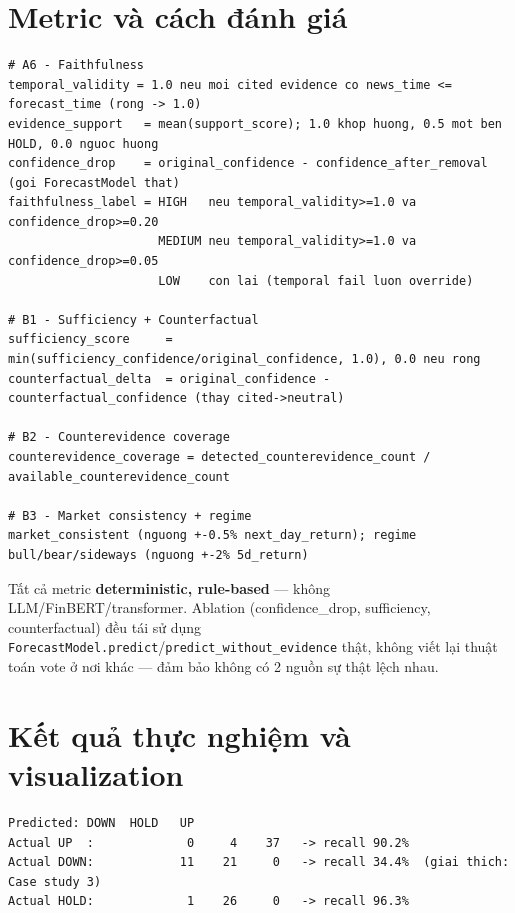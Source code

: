 \section{Metric và cách đánh giá}

\begin{singlespace}
\begin{lstlisting}[numbers=none]
# A6 - Faithfulness
temporal_validity = 1.0 neu moi cited evidence co news_time <= forecast_time (rong -> 1.0)
evidence_support   = mean(support_score); 1.0 khop huong, 0.5 mot ben HOLD, 0.0 nguoc huong
confidence_drop    = original_confidence - confidence_after_removal (goi ForecastModel that)
faithfulness_label = HIGH   neu temporal_validity>=1.0 va confidence_drop>=0.20
                     MEDIUM neu temporal_validity>=1.0 va confidence_drop>=0.05
                     LOW    con lai (temporal fail luon override)

# B1 - Sufficiency + Counterfactual
sufficiency_score     = min(sufficiency_confidence/original_confidence, 1.0), 0.0 neu rong
counterfactual_delta  = original_confidence - counterfactual_confidence (thay cited->neutral)

# B2 - Counterevidence coverage
counterevidence_coverage = detected_counterevidence_count / available_counterevidence_count

# B3 - Market consistency + regime
market_consistent (nguong +-0.5% next_day_return); regime bull/bear/sideways (nguong +-2% 5d_return)
\end{lstlisting}
\end{singlespace}

Tất cả metric \textbf{deterministic, rule-based} — không LLM/FinBERT/transformer. Ablation (confidence\_drop, sufficiency, counterfactual) đều tái sử dụng \texttt{ForecastModel.predict}/\texttt{predict\_without\_evidence} thật, không viết lại thuật toán vote ở nơi khác — đảm bảo không có 2 nguồn sự thật lệch nhau.

\section{Kết quả thực nghiệm và visualization}

\begin{singlespace}
\begin{lstlisting}[numbers=none, caption={Confusion matrix trên toàn bộ dataset — Accuracy 74\%}]
              Predicted: DOWN  HOLD   UP
Actual UP  :             0     4    37   -> recall 90.2%
Actual DOWN:            11    21     0   -> recall 34.4%  (giai thich: Case study 3)
Actual HOLD:             1    26     0   -> recall 96.3%
\end{lstlisting}
\end{singlespace}


